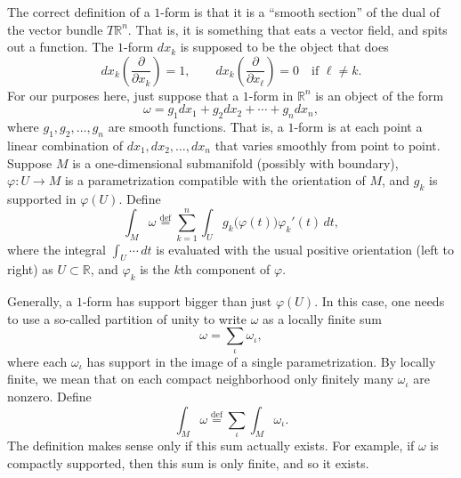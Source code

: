 \documentclass[12pt,openany]{book}
\newcommand{\R}{{\mathbb{R}}}
\theoremstyle{plain}
\theoremstyle{remark}
\theoremstyle{definition}
\theoremstyle{exercise}
\theoremstyle{example}
\begin{document}
The correct definition of a $1$-form is that it is a ``smooth section'' of
the dual of the vector bundle $T \R^n$.  That is, it is something that eats
a vector field, and spits out a function.  The $1$-form
$dx_k$ is supposed to be the object that does
\begin{equation*}
dx_k\left(
\frac{\partial}{\partial x_k}
\right)
=
1,
\qquad
dx_k\left(
\frac{\partial}{\partial x_\ell}
\right)
=
0 \quad \text{if $\ell\not=k$}.
\end{equation*}
For our purposes here, just suppose that a $1$-form
in $\R^n$ is an object of the form
\begin{equation*}
\omega = g_1 dx_1 + g_2 dx_2 + \cdots + g_n dx_n ,
\end{equation*}
where $g_1, g_2, \ldots, g_n$ are smooth functions.  That is, a $1$-form is
at each point a linear combination of $dx_1, dx_2, \ldots, dx_n$ that
varies smoothly from point to point.
Suppose $M$ is a one-dimensional submanifold
(possibly with boundary), $\varphi \colon U \to M$
is a parametrization compatible with the orientation of $M$,
and $g_k$ is supported in $\varphi(U)$.
Define
\begin{equation*}
\int_M \omega
\overset{\text{def}}{=}
\sum_{k=1}^n
\int_U g_k\bigl( \varphi(t) \bigr) \varphi_k'(t) \, dt ,
\end{equation*}
where the integral $\int_U \cdots \, dt$
is evaluated with the usual positive orientation
(left to right) as $U \subset \R$, and $\varphi_k$ is the $k$th component
of $\varphi$.

Generally, a $1$-form has support bigger than just $\varphi(U)$.  In this
case, one needs to use a so-called partition of unity to write $\omega$
as a locally finite sum
\begin{equation*}
\omega = \sum_{\iota} \omega_\iota ,
\end{equation*}
where each $\omega_\iota$ has support in the image of a single
parametrization.  By locally finite, we mean that on each compact
neighborhood only finitely many $\omega_\iota$ are nonzero.
Define
\begin{equation*}
\int_M \omega
\overset{\text{def}}{=}
\sum_{\iota}
\int_M \omega_\iota .
\end{equation*}
The definition makes sense only
if this sum actually exists.  For example, if $\omega$ is
compactly supported, then this sum is only finite, and so it exists.
\end{document}
